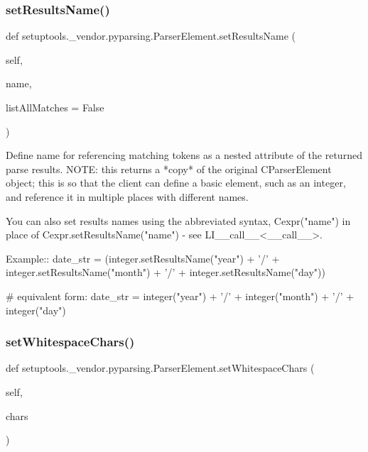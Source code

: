 \subsubsection{\texorpdfstring{set\+Results\+Name()}{setResultsName()}}
{\footnotesize\ttfamily def setuptools.\+\_\+vendor.\+pyparsing.\+Parser\+Element.\+set\+Results\+Name (\begin{DoxyParamCaption}\item[{}]{self,  }\item[{}]{name,  }\item[{}]{list\+All\+Matches = {\ttfamily False} }\end{DoxyParamCaption})}

\begin{DoxyVerb}Define name for referencing matching tokens as a nested attribute
of the returned parse results.
NOTE: this returns a *copy* of the original C{ParserElement} object;
this is so that the client can define a basic element, such as an
integer, and reference it in multiple places with different names.

You can also set results names using the abbreviated syntax,
C{expr("name")} in place of C{expr.setResultsName("name")} - 
see L{I{__call__}<__call__>}.

Example::
    date_str = (integer.setResultsName("year") + '/' 
        + integer.setResultsName("month") + '/' 
        + integer.setResultsName("day"))

    # equivalent form:
    date_str = integer("year") + '/' + integer("month") + '/' + integer("day")
\end{DoxyVerb}
 \mbox{\label{classsetuptools_1_1__vendor_1_1pyparsing_1_1ParserElement_a64f1dbcc7765fbc8899bd0ae8de22e54}} 
\subsubsection{\texorpdfstring{set\+Whitespace\+Chars()}{setWhitespaceChars()}}
{\footnotesize\ttfamily def setuptools.\+\_\+vendor.\+pyparsing.\+Parser\+Element.\+set\+Whitespace\+Chars (\begin{DoxyParamCaption}\item[{}]{self,  }\item[{}]{chars }\end{DoxyParamCaption})}

